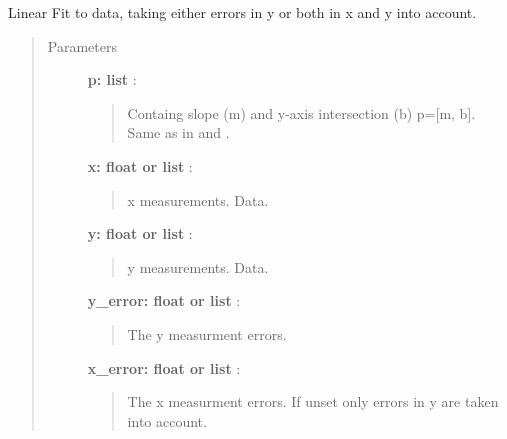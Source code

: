 \documentclass[a4paper,10pt,english]{sphinxmanual}
\begin{document}
\begin{fulllineitems}
\label{functions:astrolyze.functions.astro_functions.line_fit}
Linear Fit to data, taking either errors in y or both in x and y into
account.
\begin{quote}\begin{description}
\item[{Parameters }] \leavevmode
\textbf{p: list} :
\begin{quote}

Containg slope (m) and y-axis intersection (b) p={[}m, b{]}. Same as in
{\hyperref[functions:astrolyze.functions.astro_functions.line]{}} and .
\end{quote}

\textbf{x: float or list} :
\begin{quote}

x measurements. Data.
\end{quote}

\textbf{y: float or list} :
\begin{quote}

y measurements. Data.
\end{quote}

\textbf{y\_error: float or list} :
\begin{quote}

The y measurment errors.
\end{quote}

\textbf{x\_error: float or list} :
\begin{quote}

The x measurment errors. If unset only errors in y are taken into
account.
\end{quote}

\end{description}\end{quote}

\end{fulllineitems}

\end{document}
